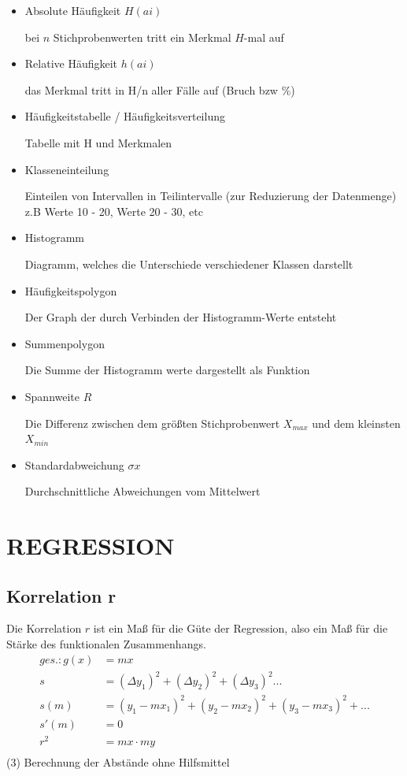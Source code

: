 \documentclass[a4paper,12pt]{article}
\begin{document}
\begin{itemize}
{	}
\item Absolute Häufigkeit $H(ai)$
	\subitem \parbox[t]{\linewidth}{
	bei $n$ Stichprobenwerten tritt ein Merkmal $H$-mal auf
	}
\item Relative Häufigkeit $h(ai)$
	\subitem \parbox[t]{\linewidth}{
	das Merkmal tritt in H/n aller Fälle auf (Bruch bzw \%)
	}
\item Häufigkeitstabelle / Häufigkeitsverteilung
	\subitem \parbox[t]{\linewidth}{
	Tabelle mit H und Merkmalen
	}
\item Klasseneinteilung
	\subitem \parbox[t]{\linewidth}{
	Einteilen von Intervallen in Teilintervalle (zur Reduzierung der Datenmenge)\\
    z.B Werte 10 - 20, Werte 20 - 30, etc
	}
\item Histogramm
	\subitem \parbox[t]{\linewidth}{
	Diagramm, welches die Unterschiede verschiedener Klassen darstellt
	}
\item Häufigkeitspolygon
	\subitem \parbox[t]{\linewidth}{
	Der Graph der durch Verbinden der Histogramm-Werte entsteht
	}
\item Summenpolygon
	\subitem \parbox[t]{\linewidth}{
	Die Summe der Histogramm werte dargestellt als Funktion
	}
\item Spannweite $R$
	\subitem \parbox[t]{\linewidth}{
	Die Differenz zwischen dem größten Stichprobenwert $X_{max}$ und dem kleinsten $X_{min}$
	}
\item Standardabweichung $\sigma x$
	\subitem \parbox[t]{\linewidth}{
	Durchschnittliche Abweichungen vom Mittelwert
	}
\end{itemize}
\pagebreak
\section{REGRESSION}
\subsection{Korrelation r}
Die Korrelation $r$ ist ein Maß für die Güte der Regression,
also ein Maß für die Stärke des funktionalen Zusammenhangs.
\begin{equation}
\begin{split}
ges.: g(x) & = mx\\
s & = (\Delta y_1)^2 + (\Delta y_2)^2 + (\Delta y_3)^2 ...\\
s(m) & = (y_1 - mx_1)^2 + (y_2 - mx_2)^2 + (y_3 - mx_3)^2 + ...\\
s'(m) & = 0\\
r^2 & = mx \cdot my\\
\end{split}
\end{equation}
(3) Berechnung der Abstände ohne Hilfsmittel
\end{document}
